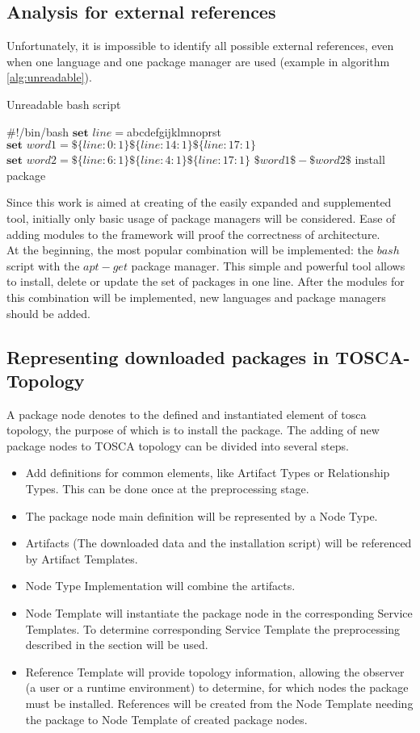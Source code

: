 \subsection{Analysis for external references}
Unfortunately, it is impossible to identify all possible external references, even when one language and one package manager are used (example in algorithm \ref{alg:unreadable}).
\begin{Algorithmus} 
	\caption{Unreadable bash script}
	\label{alg:unreadable}
	\begin{algorithmic}
		\State	\#!/bin/bash
		\State	$\textbf{set } line = $abcdefgijklmnoprst
		\State	$\textbf{set } word1 = \$\{line:0:1\}\$\{line:14:1\}\$\{line:17:1\}$ 
		\State  $\textbf{set } word2 = \$\{line:6:1\}\$\{line:4:1\}\$\{line:17:1\}$
		\State  $\$word1\$-\$word2\$$ install package
	\end{algorithmic}
\end{Algorithmus}   
Since this work is aimed at creating of the easily expanded and supplemented tool, initially only basic usage of package managers will be considered.
Ease of adding modules to the framework will proof the correctness of architecture.\\
At the beginning, the most popular combination will be implemented: the $bash$ script with the $apt-get$ package manager.
This simple and powerful tool allows to install, delete or update the set of packages in one line.
After the modules for this combination will be implemented, new languages and package managers should be added.
\subsection{Representing downloaded packages in TOSCA-Topology} \label{subs:repres}
A package node denotes to the defined and instantiated element of \gls{tosca} topology, the purpose of which is to install the package.
The adding of new package nodes to TOSCA topology can be divided into several steps.
\begin{itemize}
	\item Add definitions for common elements, like Artifact Types or Relationship Types. 
		This can be done once at the preprocessing stage.
	\item The package node main definition will be represented by a Node Type. 
	\item Artifacts (The downloaded data and the installation script) will be referenced by Artifact Templates.
	\item Node Type Implementation will combine the artifacts.
	\item Node Template will instantiate the package node in the corresponding Service Templates.
		To determine corresponding Service Template the preprocessing described in the section  will be used.
	\item Reference Template will provide topology information, allowing the observer (a user or a runtime environment) to determine, for which nodes the package must be installed.
		References will be created from the Node Template needing the package to Node Template of created package nodes.
\end{itemize}
